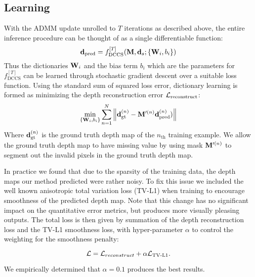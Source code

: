 
\subsection{Learning}
\label{sec:dictionary-learning}

With the ADMM update unrolled to $T$ iterations as described above, the entire inference procedure can be thought of as a single differentiable function:
\begin{equation}
    \mathbf{d}_\text{pred} = f_\text{DCCS}^{[T]}(\mathbf{M}, \mathbf{d}_s; \{\mathbf{W}_i, b_i\})
\end{equation}
Thus the dictionaries $\mathbf{W}_i$ and the bias term $b_i$ which are the parameters for $f_\text{DCCS}^{[T]}$ can be learned through  stochastic gradient descent over a suitable loss function. Using the standard sum of squared loss error, dictionary learning is formed as minimizing the depth reconstruction error $\mathcal{L}_\text{reconstruct}$:
\begin{equation}
  \label{eq:9}
  \min_{\{\mathbf{W}_i, b_i\}} \sum_{n=1}^{N}\left\Vert \mathbf{d}_\text{gt}^{(n)} - \mathbf{M}'^{(n)}  \mathbf{d}_\text{pred}^{(n)})\right\Vert
\end{equation}
Where $\mathbf{d}_\text{gt}^{(n)}$ is the ground truth depth map of the $n_\text{th}$ training example. We allow the ground truth depth map to have missing value by using mask $\mathbf{M}'^{(n)}$ to segment out the invalid pixels in the ground truth depth map. 

In practice we found that due to the sparsity of the training data, the depth maps our method predicted were rather noisy. To fix this issue we included the well known anisotropic total variation loss (TV-L1) when training to encourage smoothness of the predicted depth map. Note that this change has no significant impact on the quantitative error metrics, but produces more visually pleasing outputs. The total loss is then given by summation of the depth reconstruction loss and the TV-L1 smoothness loss, with hyper-parameter $\alpha$ to control the weighting for the smoothness penalty:

\begin{equation}
  \label{eq:9}
  \mathcal{L} = \mathcal{L}_{reconstruct} + \alpha \mathcal{L}_\text{TV-L1}.
\end{equation}

We empirically determined that $\alpha = 0.1$ produces the best results.
